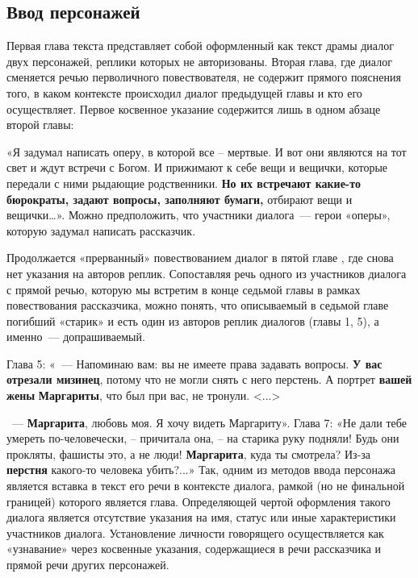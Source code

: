 \documentclass{kursa4}
\begin{document}
      \subsection{Ввод персонажей}

        Первая глава текста    представляет собой    оформленный как текст драмы  диалог двух персонажей, реплики которых не авторизованы.   Вторая глава,   где диалог сменяется речью перволичного повествователя, не содержит прямого пояснения того, в каком контексте происходил диалог предыдущей главы и кто его осуществляет.    Первое  косвенное  указание содержится   лишь  в одном абзаце второй главы:  

        «Я задумал написать оперу, в которой все – мертвые. И вот они являются на тот свет и ждут встречи с Богом. И прижимают к себе вещи и вещички, которые передали с ними рыдающие родственники. \textbf{Но их встречают какие-то бюрократы, задают вопросы, заполняют бумаги,}
        отбирают вещи и вещички…». Можно предположить, что участники диалога~--- герои «оперы», которую задумал написать рассказчик. 

        Продолжается «прерванный» повествованием диалог в пятой главе , где снова нет указания на авторов реплик. Сопоставляя речь одного из участников диалога с прямой речью, которую мы встретим в конце седьмой главы в рамках повествования рассказчика, можно понять, что описываемый в седьмой главе погибший «старик» и есть один из авторов реплик диалогов (главы 1, 5), а именно~--- допрашиваемый. 

        Глава 5: «~--- Напоминаю вам: вы не имеете права задавать вопросы. \textbf{У вас отрезали мизинец}, потому что не могли снять с него перстень. А портрет \textbf{вашей жены }\textbf{Маргариты}, что был при вас, не тронули. \textless{}...\textgreater{}

        ~--- \textbf{Маргарита}, любовь моя. Я хочу видеть Маргариту». Глава 7: «Не дали тебе умереть по-человечески, – причитала она, – на старика руку подняли! Будь они прокляты, фашисты это, а не люди! \textbf{Маргарита}, куда ты смотрела? Из-за \textbf{перстня} какого-то человека убить?...» Так, одним из методов ввода персонажа является вставка в текст его речи в контексте диалога, рамкой (но не финальной границей) которого является глава. Определяющей чертой оформления такого диалога является отсутствие указания на имя, статус или иные характеристики участников диалога. Установление личности говорящего осуществляется как «узнавание» через косвенные указания, содержащиеся в речи рассказчика и прямой речи других персонажей. 
\end{document}
